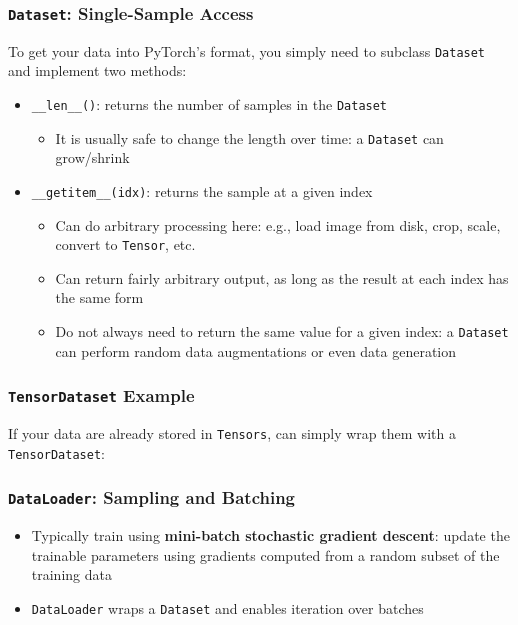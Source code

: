 \documentclass[xcolor={x11names,table}]{beamer}
\begin{document}
\begin{frame}
	\frametitle{\lstinline!Dataset!: Single-Sample Access}
	To get your data into PyTorch's format, you simply need to subclass \lstinline!Dataset! and implement two methods:
	\begin{itemize}
		\item \lstinline!__len__()!: returns the number of samples in the \lstinline!Dataset!
		\begin{itemize}
			\item It is usually safe to change the length over time: a \lstinline!Dataset! can grow/shrink
		\end{itemize}
		\item \lstinline!__getitem__(idx)!: returns the sample at a given index
		\begin{itemize}
			\item Can do arbitrary processing here: e.g., load image from disk, crop, scale, convert to \lstinline!Tensor!, etc.
			\item Can return fairly arbitrary output, as long as the result at each index has the same form
			\item Do not always need to return the same value for a given index: a \lstinline!Dataset! can perform random data augmentations or even data generation
		\end{itemize}
	\end{itemize}
\end{frame}

\begin{frame}
	\frametitle{\lstinline!TensorDataset! Example}
	If your data are already stored in \lstinline!Tensors!, can simply wrap them with a \lstinline!TensorDataset!:
	
\end{frame}

\begin{frame}
	\frametitle{\lstinline!DataLoader!: Sampling and Batching}
	\begin{itemize}
		\item Typically train using \textbf{mini-batch stochastic gradient descent}: update the trainable parameters using gradients computed from a random subset of the training data
		\item \lstinline!DataLoader! wraps a \lstinline!Dataset! and enables iteration over batches
	\end{itemize}
	{
		\small
		
	}
\end{frame}
\end{document}
